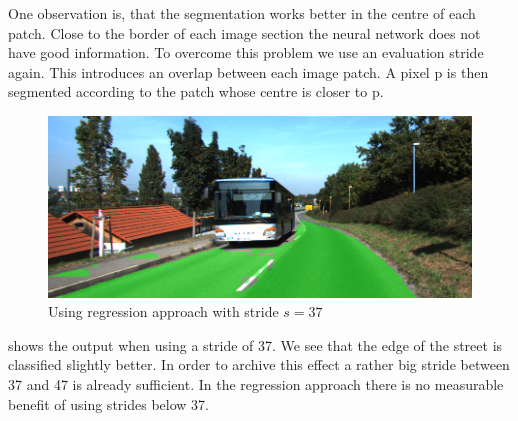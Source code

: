 One observation is, that the segmentation works better in the centre of each patch. Close to the border of each image section the neural network does not have good information. To overcome this problem we use an evaluation stride again. This introduces an overlap between each image patch. A pixel p is then segmented according to the patch whose centre is closer to p.




\begin{figure}[]
	\centering
	\includegraphics[width=\columnwidth]{figures/models/testing2-um_32_conv_stride37.png}
	\caption{Using regression approach with stride $s=37$}
	\label{fig:reg_stride37}
\end{figure}

 shows the output when using a stride of 37. We see that the edge of the street is classified slightly better. In order to archive this effect a rather big stride between 37 and 47 is already sufficient. In the regression approach there is no measurable benefit of using strides below 37.

